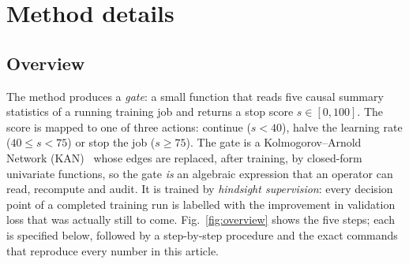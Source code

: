 \section*{Method details}

\subsection*{Overview}
The method produces a \emph{gate}: a small function that reads five causal summary statistics of a running training job and returns a stop score $s\in[0,100]$. The score is mapped to one of three actions: continue ($s<40$), halve the learning rate ($40\le s<75$) or stop the job ($s\ge75$). The gate is a Kolmogorov--Arnold Network (KAN)~\cite{liu2025kan} whose edges are replaced, after training, by closed-form univariate functions, so the gate \emph{is} an algebraic expression that an operator can read, recompute and audit. It is trained by \emph{hindsight supervision}: every decision point of a completed training run is labelled with the improvement in validation loss that was actually still to come. Fig.~\ref{fig:overview} shows the five steps; each is specified below, followed by a step-by-step procedure and the exact commands that reproduce every number in this article.

